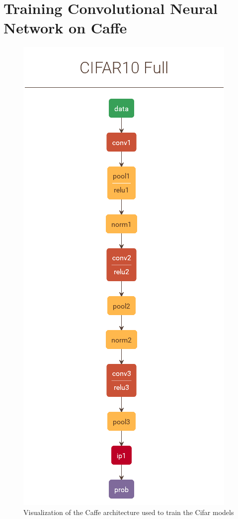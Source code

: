 \documentclass[paper=a4, fontsize=11pt]{scrartcl}
\numberwithin{equation}{section}		%
\numberwithin{figure}{section}			%
\numberwithin{table}{section}			%
\begin{document}
	\section{Training Convolutional Neural Network on Caffe}
	\begin{figure}[!htb]
		\centering
		\includegraphics[scale=0.4]{cifar.png}
		\caption{Visualization of the Caffe architecture used to train the Cifar models}
		\label{fig:cifar}
	\end{figure}
\end{document}
